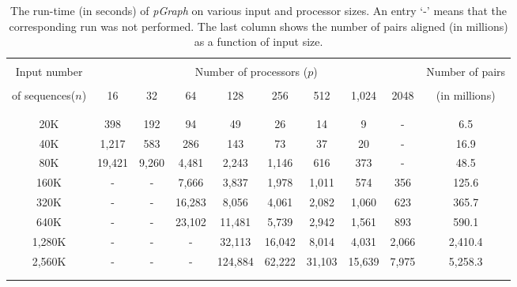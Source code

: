 \documentclass[10pt,journal,letterpaper,compsoc]{IEEEtran}
\def\colrule{\\[-7pt]\hline\\[-6pt]}
\begin{document}
\begin{table}[thb]
\begin{center}
\begin{tabular}{ccccccccc||c}
\colrule
Input number & \multicolumn{8}{c||}{Number of processors ($p$)}& Number of pairs\\[2pt]  \cline{2-9} \\[-7pt]
\multicolumn{1}{c}{of sequences($n$)} & 16 & 32 & 64 & 128 & 256 & 512 & 1,024 & 2048 &  (in millions)\\
 \colrule
 20K & 398 & 192 & 94 & 49 & 26 & 14 & 9 & - & 6.5 \\
 40K & 1,217 & 583 & 286 & 143 & 73 & 37 &  20 & - & 16.9\\
 80K & 19,421  & 9,260  & 4,481 & 2,243 & 1,146 & 616 & 373 & - & 48.5\\
 160K & -  & - & 7,666 & 3,837 & 1,978  & 1,011  & 574 & 356 & 125.6\\
 320K & - & - &  16,283 & 8,056 & 4,061 & 2,082 & 1,060 & 623 & 365.7\\
 640K & - & - & 23,102 & 11,481 & 5,739  & 2,942  & 1,561 & 893 & 590.1 \\
 1,280K & - & - & - & 32,113 & 16,042  & 8,014  & 4,031 & 2,066 & 2,410.4 \\
 2,560K & - & - & - & 124,884 & 62,222  & 31,103  & 15,639 & 7,975 & 5,258.3\\
 \colrule
\end{tabular}
\end{center}
\caption{\label{tabRuntime}
The run-time (in seconds) of \emph{pGraph} on various input and processor sizes. An entry `-' means that the corresponding run was not performed. The last column shows the number of pairs aligned (in millions) as a function of input size.
}
\end{table}
\end{document}
